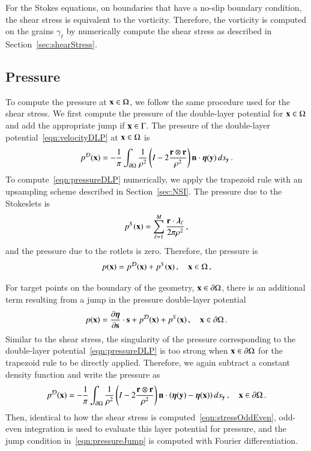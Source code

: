 \documentclass[preprint, 10pt]{elsarticle}
\begin{document}
For the Stokes equations, on boundaries that have a no-slip boundary
condition, the shear stress is equivalent to the vorticity.  Therefore,
the vorticity is computed on the grains $\gamma_\ell$ by numerically
compute the shear stress as described in Section~\ref{sec:shearStress}.

\subsection{Pressure}
\label{sec:pressure}
To compute the pressure at ${\mathbf{x}} \in \Omega$, we follow the same
procedure used for the shear stress.  We first compute the pressure of
the double-layer potential for ${\mathbf{x}} \in \Omega$ and add the appropriate
jump if ${\mathbf{x}} \in \Gamma$. The pressure of the double-layer
potential~\eqref{eqn:velocityDLP} at ${\mathbf{x}} \in \Omega$ is
\begin{align}
  p^{{\mathcal{D}}}({\mathbf{x}}) = -\frac{1}{\pi}\int_{{\partial}\Omega} \frac{1}{\rho^2}
    \left(I - 2 \frac{{\mathbf{r}} \otimes {\mathbf{r}}}{\rho^2}\right) 
    {\mathbf{n}} \cdot {\boldsymbol\eta}({\mathbf{y}}) \,ds_{\mathbf{y}} \, .
    \label{eqn:pressureDLP}
\end{align}
To compute~\eqref{eqn:pressureDLP} numerically, we apply the trapezoid
rule with an upsampling scheme described in Section~\ref{sec:NSI}.  The
pressure due to the Stokeslets is
\begin{align}
  p^S({\mathbf{x}}) = \sum_{\ell=1}^{M}\frac{{\mathbf{r}} \cdot
  {\boldsymbol\lambda}_\ell}{2\pi\rho^2}\, ,
\end{align}
and the pressure due to the rotlets is zero.  Therefore, the pressure is
\begin{align}
  p({\mathbf{x}}) = p^{{\mathcal{D}}}({\mathbf{x}}) + p^{S}({\mathbf{x}})\, , \quad {\mathbf{x}} \in \Omega \, ,
\end{align}

For target points on the boundary of the geometry, ${\mathbf{x}} \in {\partial} \Omega$,
there is an additional term resulting from a jump in the pressure
double-layer potential~\cite{poz1992}
\begin{align}
  p({\mathbf{x}})= \frac{\partial {\boldsymbol\eta}}{\partial {\mathbf{s}}} \cdot {\mathbf{s}} + p^{{\mathcal{D}}}({\mathbf{x}}) + 
              p^{S}({\mathbf{x}})\, , \quad {\mathbf{x}} \in {\partial}\Omega \, .
  \label{eqn:pressureJump}
\end{align}
Similar to the shear stress, the singularity of the pressure
corresponding to the double-layer potential~\eqref{eqn:pressureDLP} is
too strong when ${\mathbf{x}} \in {\partial}\Omega$ for the trapezoid rule to be
directly applied.  Therefore, we again subtract a constant density
function and write the pressure as
\begin{equation}
\begin{aligned}
  p^{\mathcal{D}}({\mathbf{x}}) = -\frac{1}{\pi}\int_{{\partial}\Omega} \frac{1}{\rho^2}
    \left(I - 2 \frac{{\mathbf{r}} \otimes {\mathbf{r}}}{\rho^2}\right) 
    {\mathbf{n}} \cdot ({\boldsymbol\eta}({\mathbf{y}}) - {\boldsymbol\eta}({\mathbf{x}})) \,ds_{\mathbf{y}}\, , 
    \quad {\mathbf{x}} \in {\partial}\Omega\, .
\end{aligned}
\end{equation}
Then, identical to how the shear stress is
computed~\eqref{eqn:stressOddEven}, odd-even integration is used to
evaluate this layer potential for pressure, and the jump condition
in~\eqref{eqn:pressureJump} is computed with Fourier differentiation. 
\end{document}
